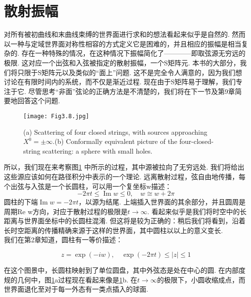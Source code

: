 \section{散射振幅}%

对所有被初曲线和末曲线束缚的世界面进行求和的想法看起来似乎是自然的. 然而以一种与定域世界面对称性相容的方式定义它是困难的，并且相应的振幅是相当复杂的. 存在一种特殊的情况，在这种情况下振幅简化了————即取弦源无穷远的极限. 这对应一个出弦和入弦被指定的散射振幅，一个S矩阵元. 本书的大部分，我们将只限于S矩阵元以及类似的“面上”问题. 这不是完全令人满意的，因为我们想讨论在有限时间内的系统，而不仅是渐近过程. 现在由于S矩阵易于理解，我们专注于它. 尽管思考“非面”弦论的正确方法是不清楚的，我们将在下一节及第9章简要地回答这个问题.\\
\begin{figure}
	\begin{center}
		\texttt{[image: Fig3.8.jpg]}\\
		\caption{(a) Scattering of four closed strings, with sources approaching $X^{0}=\pm \infty$.(b) Conformally equivalent picture of the four-closed-string scattering: a sphere
			with small holes.}\label{Fig3.8}
	\end{center}
\end{figure}
所以，我们现在来考察图\ref{Fig3.8} 中所示的过程，其中源被拉向了无穷远处. 我们将给出这些源应该如何在路径积分中表示的一个理论. 远离散射过程，弦自由地传播，每个出弦与入弦是一个长圆柱，可以用一个复坐标w描述：
\begin{equation}
-2 \pi t \leq \operatorname{Im} w \leq 0, \quad w \cong w+2 \pi
\end{equation}
圆柱的下端$\operatorname{Im} w=-2 \pi t$，以源为结尾. 上端插入世界面的其余部分，并且圆周是周期Re w方向，对应于散射过程的极限是$t \rightarrow \infty$. 看起来似乎是我们将时空中的长距离与世界面坐标中的长圆柱混淆. 但这将是较为正确的：稍后我们将看到，沿着长时空距离的传播精确来源于这样的世界面，其中圆柱以以上的意义变长.\\
我们在第2章知道，圆柱有一等价描述：

\begin{equation}
z=\exp (-i w), \quad \exp (-2 \pi t) \leq|z| \leq 1
\end{equation}

在这个图景中，长圆柱映射到了单位圆盘，其中外弦态是处在中心的圆. 在内部度规的几何中，图\ref{Fig3.8}a过程现在看起来像是\ref{Fig3.8}b. 在$t \rightarrow \infty$的极限下，小圆收缩成点，而世界面退化至对于每一外态有一类点插入的球面.\\

